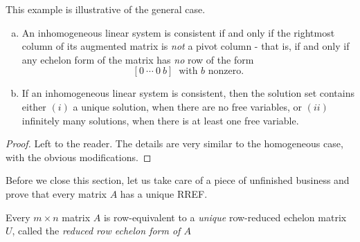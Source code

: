 \documentclass[12pt,letterpaper,reqno]{article}
\numberwithin{equation}{section}
\newcommand{\ti}[1]{\textit{#1}}
\begin{document}
This example is illustrative of the general case.

\begin{thm}\label{thm:existence_and_uniqueness_for_inhomogeneous_systems} \hspace{10cm}
\begin{enumerate}[(a)]
	\item An inhomogeneous linear system is consistent if and only if the rightmost column of its augmented matrix is \ti{not} a pivot column - that is, if and only if any echelon form of the matrix has \ti{no} row of the form
	$$[0 \ \cdots \ 0\  b] \ \text{ with $b$ nonzero.}$$
	\item If an inhomogeneous linear system is consistent, then the solution set contains either $(i)$ a unique solution, when there are no free variables, or $(ii)$ infinitely many solutions, when there is at least one free variable.
\end{enumerate}
\end{thm}

\begin{proof}
	Left to the reader. The details are very similar to the homogeneous case, with the obvious modifications.
\end{proof}

Before we close this section, let us take care of a piece of unfinished business and prove that every matrix $A$ has a unique RREF.

\begin{thm}\label{thm:uniqueness_of_reduced_row_echelon_form}
	Every $m \times n$ matrix $A$ is row-equivalent to a \emph{unique} row-reduced echelon matrix $U$, called the \emph{reduced row echelon form of $A$}
\end{thm}
\end{document}
